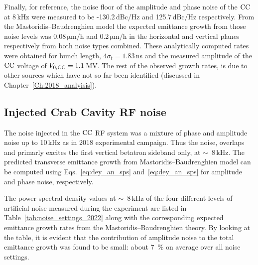 Finally, for reference, the noise floor of the amplitude and phase noise of the ${\mathrm{CC}}$ at 8\,kHz were measured to be -130.2\,dBc/Hz and 125.7\,dBc/Hz respectively. From the Mastoridis--Baudrenghien model the expected emittance growth from those noise levels was 0.08\,$\mathrm{\mu m/h}$ and 0.2\,$\mathrm{\mu m/h}$ in the horizontal and vertical planes respectively from both noise types combined. These analytically computed rates were obtained for bunch length, $4\sigma_t=1.83$\,ns and the measured amplitude of the ${\mathrm{CC}}$ voltage of ${V_\mathrm{0, CC}}=1.1$\,MV.
The rest of the observed growth rates, is due to other sources which have not so far been identified (discussed in Chapter~\ref{Ch:2018_analyisis}).



\subsection{Injected Crab Cavity RF noise}\label{sec:injected_cc_noise_2022}
The noise injected in the ${\mathrm{CC}}$ RF system was a mixture of phase and amplitude noise up to 10\,kHz as in 2018 experimental campaign. Thus the noise, overlaps and primarly excites the first vertical betatron sideband only, at $\sim$~8\,kHz. The predicted transverse emittance growth from Mastoridis--Baudrenghien model can be computed using Eqs.~\eqref{eq:dey_an_sps} and~\eqref{eq:dey_an_sps} for amplitude and phase noise, respectively.

The power spectral density values at $\sim$~8\,kHz of the four different levels of artificial noise measured during the experiment are listed in Table~\ref{tab:noise_settings_2022} along with the corresponding expected emittance growth rates from the Mastoridis--Baudrenghien theory. By looking at the table, it is evident that the contribution of amplitude noise to the total emittance growth was found to be small: about 7~$\%$ on average over all noise settings.




